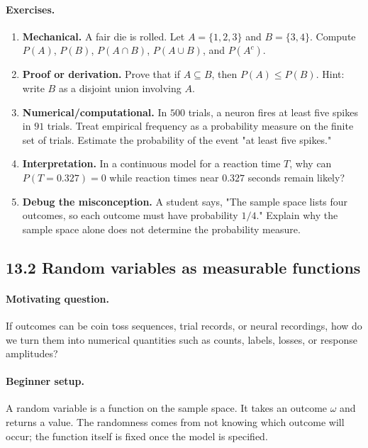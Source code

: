 \paragraph{Exercises.}
\begin{enumerate}[label=\textbf{13.1.\arabic*.}, leftmargin=*]
\item \textbf{Mechanical.} A fair die is rolled. Let \(A=\{1,2,3\}\) and \(B=\{3,4\}\). Compute \(P(A)\), \(P(B)\), \(P(A\cap B)\), \(P(A\cup B)\), and \(P(A^c)\).
\item \textbf{Proof or derivation.} Prove that if \(A\subseteq B\), then \(P(A)\leq P(B)\). Hint: write \(B\) as a disjoint union involving \(A\).
\item \textbf{Numerical/computational.} In \(500\) trials, a neuron fires at least five spikes in \(91\) trials. Treat empirical frequency as a probability measure on the finite set of trials. Estimate the probability of the event "at least five spikes."
\item \textbf{Interpretation.} In a continuous model for a reaction time \(T\), why can \(P(T=0.327)=0\) while reaction times near \(0.327\) seconds remain likely?
\item \textbf{Debug the misconception.} A student says, "The sample space lists four outcomes, so each outcome must have probability \(1/4\)." Explain why the sample space alone does not determine the probability measure.
\end{enumerate}

\subsection{13.2 Random variables as measurable functions}

\paragraph{Motivating question.}
If outcomes can be coin toss sequences, trial records, or neural recordings, how do we turn them into numerical quantities such as counts, labels, losses, or response amplitudes?

\paragraph{Beginner setup.}
A random variable is a function on the sample space. It takes an outcome \(\omega\) and returns a value. The randomness comes from not knowing which outcome will occur; the function itself is fixed once the model is specified.

